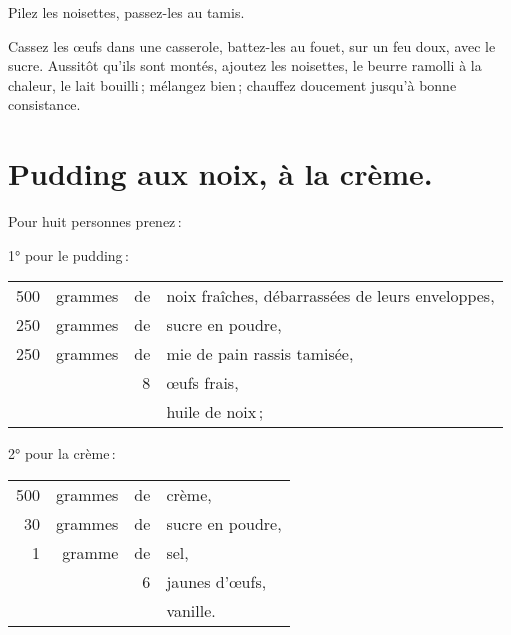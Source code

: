 Pilez les noisettes, passez-les au tamis.

Cassez les œufs dans une casserole, battez-les au fouet, sur un feu doux, avec
le sucre. Aussitôt qu'ils sont montés, ajoutez les noisettes, le beurre ramolli
à la chaleur, le lait bouilli ; mélangez bien ; chauffez doucement jusqu'à
bonne consistance.

\section*{\centering Pudding aux noix, à la crème.}
{}

Pour huit personnes prenez :

\medskip

1° pour le pudding :

\footnotesize
\begin{longtable}{rrrp{16em}}
    500 & grammes & de & noix fraîches, débarrassées de leurs enveloppes,                                 \\
    250 & grammes & de & sucre en poudre,                                                                 \\
    250 & grammes & de & mie de pain rassis tamisée,                                                      \\
        &         &  8 & œufs frais,                                                                      \\
        &         &    & huile de noix ;                                                                  \\
\end{longtable}
\normalsize

2° pour la crème :

\footnotesize
\begin{longtable}{rrrp{16em}}
    500 & grammes & de & crème,                                                                           \\
     30 & grammes & de & sucre en poudre,                                                                 \\
      1 & gramme  & de & sel,                                                                             \\
        &         &  6 & jaunes d'œufs,                                                                   \\
        &         &    & vanille.                                                                         \\
\end{longtable}
\normalsize

